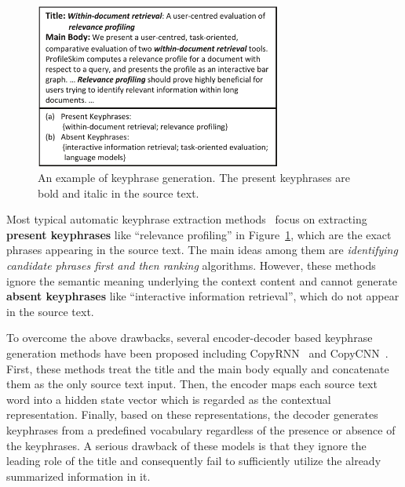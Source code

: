 \documentclass[letterpaper]{article} %
\begin{document}
\begin{figure}
\centering
\includegraphics[width=3.2in]{figures/PaperID3210_TGNet_intro_case_study_cmyk.pdf}
\caption{An example of keyphrase generation. The present keyphrases are bold and italic in the source text.}
\label{figure: keyphrase generation example}
\end{figure}

Most typical automatic keyphrase extraction methods~\cite{witten1999kea,medelyan2009human,mihalcea2004textrank} focus on extracting \textbf{present keyphrases} like ``relevance profiling'' in Figure~\ref{figure: keyphrase generation example}, which are the exact phrases appearing in the source text. The main ideas among them are \textit{identifying candidate phrases first and then ranking} algorithms. However, these methods ignore the semantic meaning underlying the context content and cannot generate \textbf{absent keyphrases} like ``interactive information retrieval'', which do not appear in the source text.


To overcome the above drawbacks, several encoder-decoder based keyphrase generation methods have been proposed including CopyRNN~\cite{meng2017dkg} and CopyCNN~\cite{zhang2017dkg_conv}. First, these methods treat the title and the main body equally and concatenate them as the only source text input. Then, the encoder maps each source text word into a hidden state vector which is regarded as the contextual representation. Finally, based on these representations, the decoder generates keyphrases from a predefined vocabulary regardless of the presence or absence of the keyphrases.
A serious drawback of these models is that they ignore the leading role of the title and consequently fail to sufficiently utilize the already summarized information in it.
\end{document}

